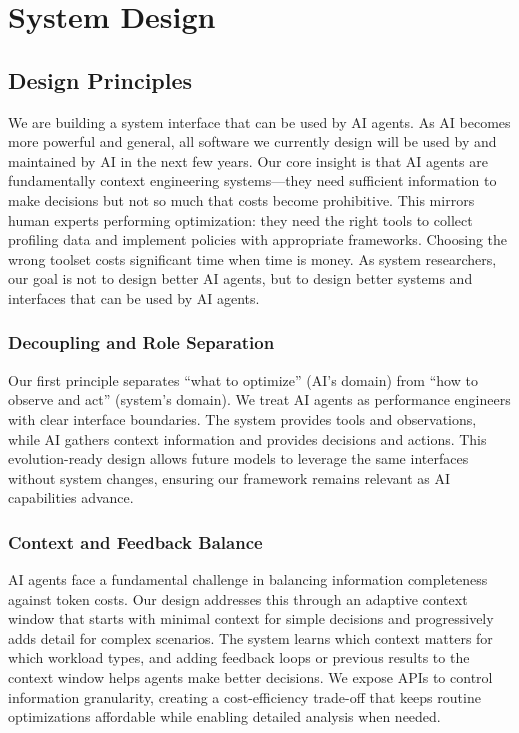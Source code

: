 \section{System Design}
\label{sec:design}

\subsection{Design Principles}

We are building a system interface that can be used by AI agents. As AI becomes more powerful and general, all software we currently design will be used by and maintained by AI in the next few years. Our core insight is that AI agents are fundamentally context engineering systems—they need sufficient information to make decisions but not so much that costs become prohibitive. This mirrors human experts performing optimization: they need the right tools to collect profiling data and implement policies with appropriate frameworks. Choosing the wrong toolset costs significant time when time is money. As system researchers, our goal is not to design better AI agents, but to design better systems and interfaces that can be used by AI agents.

\subsubsection{Decoupling and Role Separation}

Our first principle separates ``what to optimize'' (AI's domain) from ``how to observe and act'' (system's domain). We treat AI agents as performance engineers with clear interface boundaries. The system provides tools and observations, while AI gathers context information and provides decisions and actions. This evolution-ready design allows future models to leverage the same interfaces without system changes, ensuring our framework remains relevant as AI capabilities advance.

\subsubsection{Context and Feedback Balance}

AI agents face a fundamental challenge in balancing information completeness against token costs. Our design addresses this through an adaptive context window that starts with minimal context for simple decisions and progressively adds detail for complex scenarios. The system learns which context matters for which workload types, and adding feedback loops or previous results to the context window helps agents make better decisions. We expose APIs to control information granularity, creating a cost-efficiency trade-off that keeps routine optimizations affordable while enabling detailed analysis when needed.

